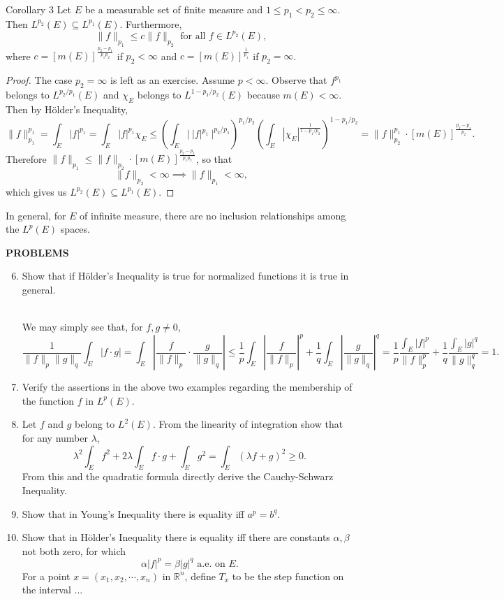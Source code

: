 \begin{namedthm*}{Corollary 3}
	Let $E$ be a measurable set of finite measure and $1\le p_1<p_2\le\infty$.
	Then $L^{p_2}(E)\subseteq L^{p_1}(E)$.
	Furthermore,
	\[
		\|f\|_{p_1}\le c\|f\|_{p_2}\text{ for all }f\in L^{p_2}(E),
	\]
	where $c=[m(E)]^{\frac{p_2-p_1}{p_1p_2}}$ if $p_2<\infty$ and $c=[m(E)]^{\frac{1}{p_1}}$ if $p_2=\infty$.
\end{namedthm*}
\begin{proof}
	The case $p_2=\infty$ is left as an exercise.
	Assume $p<\infty$.
	Observe that $f^{p_1}$ belongs to $L^{p_2/p_1}(E)$ and $\chi_E$ belongs to $L^{1-{p_1/p_2}}(E)$ because $m(E)<\infty$.
	Then by H\"older's Inequality,
	\[
		\|f\|_{p_1}^{p_1}
		=\int_E|f|^{p_1}
		=\int_E|f|^{p_1}\chi_E
		\le\left(\int_E|\ |f|^{p_1}\ |^{p_2/p_1}\right)^{p_1/p_2}\left(\int_E|\chi_E|^{\frac{1}{1-p_1/p_2}}\right)^{1-{p_1/p_2}}
		=\|f\|_{p_2}^{p_1}\cdot[m(E)]^{\frac{p_2-p_1}{p_2}}.
	\]
	Therefore $\|f\|_{p_1}\le \|f\|_{p_2}\cdot[m(E)]^{\frac{p_2-p_1}{p_1p_2}}$, so that 
	\[
		\|f\|_{p_2}<\infty\implies \|f\|_{p_1}<\infty,
	\]
	which gives us $L^{p_2}(E)\subseteq L^{p_1}(E)$.
\end{proof}
In general, for $E$ of infinite measure, there are no inclusion relationships among the $L^p(E)$ spaces.

\begin{center}
	\textbf{PROBLEMS}
\end{center}
\begin{enumerate}
	\setcounter{enumi}{5}
	\item Show that if H\"older's Inequality is true for normalized functions it is true in general.
	
	\ \\We may simply see that, for $f,g\neq0$,
	\[
		\frac{1}{\|f\|_p\|g\|_q}\int_E|f\cdot g|=\int_E|\frac{f}{\|f\|_p}\cdot \frac{g}{\|g\|_q}|\le\frac{1}{p}\int_E|\frac{f}{\|f\|_p}|^p+\frac{1}{q}\int_E|\frac{g}{\|g\|_q}|^q=\frac{1}{p}\frac{\int_E|f|^p}{\|f\|_p^p}+\frac{1}{q}\frac{\int_E|g|^q}{\|g\|_q^q}=1.
	\]
	\item Verify the assertions in the above two examples regarding the membership of the function $f$ in $L^p(E)$. 
	\item Let $f$ and $g$ belong to $L^2(E)$. From the linearity of integration show that for any number $\lambda$,
	\[
		\lambda^2\int_Ef^2+2\lambda\int_Ef\cdot g+\int_Eg^2=\int_E(\lambda f+g)^2\ge0.	
	\] 
	From this and the quadratic formula directly derive the Cauchy-Schwarz Inequality.
	\item Show that in Young's Inequality there is equality iff $a^p=b^q$.
	\item Show that in H\"older's Inequality there is equality iff there are constants $\alpha,\beta$ not both zero, for which
	\[
		\alpha|f|^p=\beta|g|^q\text{ a.e. on }E.	
	\]
	For a point $x=(x_1,x_2,\cdots,x_n)$ in $\mathbb{R}^n$, define $T_x$ to be the step function on the interval ...
\end{enumerate}

